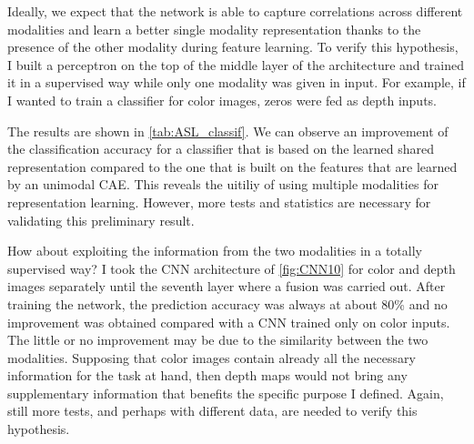Ideally, we expect that the network is able to capture correlations
across different modalities and learn a better single modality
representation thanks to the presence of the other modality
during feature learning. To verify this hypothesis, I built a perceptron
on the top of the middle layer of the architecture and trained it
in a supervised way while only one modality was given in input. For example,
if I wanted to train a classifier for color images, zeros were fed as
depth inputs.

The results are shown in \autoref{tab:ASL_classif}.
We can observe an improvement of the classification accuracy for a
classifier that is based on the learned shared representation 
compared to the one that is built on the features that are learned by
an unimodal CAE. This reveals the uitiliy of using multiple modalities
for representation learning. However, more tests and statistics
are necessary for validating this preliminary result.

How about exploiting the information from the two modalities in a
totally supervised way? I took the CNN architecture of \autoref{fig:CNN10}
for color and depth images separately until the seventh layer where
a fusion was carried out. After training the network, the prediction
accuracy was always at about 80\% and no improvement was obtained compared
with a CNN trained only on color inputs. The little or no improvement
may be due to the similarity between the two modalities. Supposing that
color images contain already all the necessary information for the task
at hand, then depth maps would not bring any supplementary information
that benefits the specific purpose I defined. Again, still more tests,
and perhaps with different data, are needed to verify this hypothesis.

